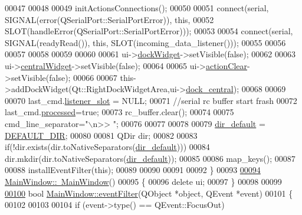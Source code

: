 \begin{DoxyCode}
00047 
00048 
00049           initActionsConnections();
00050 
00051             connect(serial, SIGNAL(error(QSerialPort::SerialPortError)), \textcolor{keyword}{this},
00052             SLOT(handleError(QSerialPort::SerialPortError)));
00053 
00054             connect(serial, SIGNAL(readyRead()), \textcolor{keyword}{this}, SLOT(incoming\_data\_listener()));
00055 
00056 
00057 
00058 
00059 
00060 
00061            ui->\hyperlink{a00027_ac8a083c4b66fb317a9b538409ce412e2}{dockWidget}->setVisible(\textcolor{keyword}{false});
00062 
00063            ui->\hyperlink{a00027_a30075506c2116c3ed4ff25e07ae75f81}{centralWidget}->setVisible(\textcolor{keyword}{false});
00064 
00065            ui->\hyperlink{a00027_ac8539dcd87955047877cb256aff60453}{actionClear}->setVisible(\textcolor{keyword}{false});
00066 
00067           this->addDockWidget(Qt::RightDockWidgetArea,ui->\hyperlink{a00027_a19105d0d919fa33b5f29f7677bbab054}{dock\_central});
00068 
00069 
00070           last\_cmd.\hyperlink{a00001_abb76d8edb39876deb60975c8fd784b3f}{listener\_slot} = NULL;
00071           \textcolor{comment}{//serial rc buffer start frash}
00072           last\_cmd.\hyperlink{a00001_a3e88f779da9798a5da7dda227e2ca388}{processed}=\textcolor{keyword}{true};
00073           rc\_buffer.clear();
00074 
00075           cmd\_line\_separator=\textcolor{stringliteral}{"\(\backslash\)n>> "};
00076 
00077 
00078 
00079           \hyperlink{a00006_a2e107e43aeaccaf4c9a42254f13122c8}{dir\_default} = \hyperlink{a00039_a63ec0cea9c1f0ca8a7893c2c53d2fd81}{DEFAULT\_DIR};
00080 
00081           QDir dir;
00082 
00083           \textcolor{keywordflow}{if}(!dir.exists(dir.toNativeSeparators(\hyperlink{a00006_a2e107e43aeaccaf4c9a42254f13122c8}{dir\_default})))
00084               dir.mkdir(dir.toNativeSeparators(\hyperlink{a00006_a2e107e43aeaccaf4c9a42254f13122c8}{dir\_default}));
00085 
00086           map\_keys();
00087 
00088           installEventFilter(\textcolor{keyword}{this});
00089 
00090 
00091 
00092 \}
00093 
\hypertarget{a00038_source_l00094}{}\hyperlink{a00006_ae98d00a93bc118200eeef9f9bba1dba7}{00094} \hyperlink{a00006_ae98d00a93bc118200eeef9f9bba1dba7}{MainWindow::~MainWindow}()
00095 \{
00096     \textcolor{keyword}{delete} ui;
00097 \}
00098 
00099 
\hypertarget{a00038_source_l00100}{}\hyperlink{a00006_a91df90bb5045775882c062cefdf903e9}{00100} \textcolor{keywordtype}{bool} \hyperlink{a00006_a91df90bb5045775882c062cefdf903e9}{MainWindow::eventFilter}(QObject *\textcolor{keywordtype}{object}, QEvent *event)
00101 \{
00102 
00103 
00104     \textcolor{keywordflow}{if} (event->type() == QEvent::FocusOut)

\end{DoxyCode}

